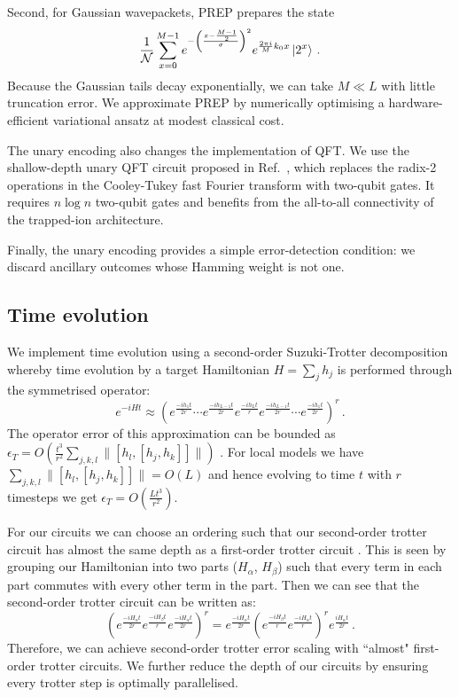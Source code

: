 \documentclass[aps,floatfix,10pt,amssymb,amsfont,amsmath,superscriptaddress,float,nofootinbib,longbibliography,nobalancelastpage,twocolumn]{revtex4-2}
\begin{document}
Second, for Gaussian wavepackets, \textsc{PREP} prepares the state
\begin{equation}
    \frac{1}{\mathcal{N}}\sum_{x=0}^{M-1}e^{-\left(\frac{x-\frac{M-1}{2}}{\sigma}\right)^2}e^{\frac{2\pi i}{M}k_0 x} \ket{2^x}\,.
\end{equation}
Because the Gaussian tails decay exponentially, we can take $M\ll L$ with little truncation error. We approximate \textsc{PREP} by numerically optimising a hardware-efficient variational ansatz at modest classical cost.

The unary encoding also changes the implementation of \textsc{QFT}. We use the shallow-depth unary QFT circuit proposed in Ref.~\cite{jain2024quantum}, which replaces the radix-2 operations in the Cooley-Tukey fast Fourier transform \cite{cooleytukey} with two-qubit gates. It requires $n\log n$ two-qubit gates and benefits from the all-to-all connectivity of the trapped-ion architecture. 

Finally, the unary encoding provides a simple error-detection condition: we discard ancillary outcomes whose Hamming weight is not one.

\subsection{Time evolution}
We implement time evolution using a second-order Suzuki-Trotter decomposition \cite{suzuki1976generalized, suzuki1991general} whereby time evolution by a target Hamiltonian $H=\sum_j h_j$ is performed through the symmetrised operator:
\begin{equation}
   e^{-iHt} \approx \left(e^{\frac{ -ih_1 t}{2r}}\cdots e^{\frac{ -ih_{L-1} t}{2r}}e^{\frac{ -ih_L t}{r}} e^{\frac{ -ih_{L-1} t}{2r}}\cdots e^{\frac{ -ih_1 t}{2r}}\right)^r\,.
\end{equation}
The operator error of this approximation can be bounded as $\epsilon_T=O\left(\frac{t^3}{r^2}\sum_{j,k,l}\|[h_l,[h_j,h_k]]\|\right)$ \cite{childs2021theory}. For local models we have $\sum_{j,k,l}\|[h_l,[h_j,h_k]]\|=O(L)$ and hence evolving to time $t$ with $r$ timesteps we get $\epsilon_T=O\left(\frac{L t^3}{r^2}\right)$.

For our circuits we can choose an ordering such that our second-order trotter circuit has almost the same depth as a first-order trotter circuit \cite{layden2022first}. This is seen by grouping our Hamiltonian into two parts ($H_\alpha$, $H_\beta$) such that every term in each part commutes with every other term in the part. Then we can see that the second-order trotter circuit can be written as:
\begin{equation}
    \left(e^{\frac{ -iH_\alpha t}{2r}}e^{\frac{ -iH_\beta t}{r}} e^{\frac{ -iH_\alpha t}{2r}}\right)^r = e^{\frac{ -iH_\alpha t}{2r}}\left(e^{\frac{ -iH_\beta t}{r}} e^{\frac{ -iH_\alpha t}{r}}\right)^r e^{\frac{ iH_\alpha t}{2r}}\,.
\end{equation}
Therefore, we can achieve second-order trotter error scaling with ``almost" first-order trotter circuits. We further reduce the depth of our circuits by ensuring every trotter step is optimally parallelised.
\end{document}
